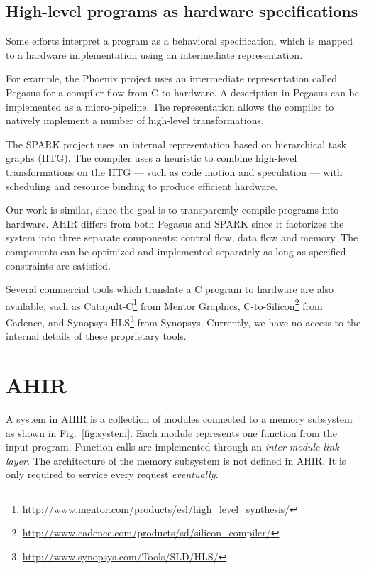 \documentclass[conference]{IEEEtran}
\begin{document}
\subsection{High-level programs as hardware specifications}

Some efforts interpret a program as a behavioral
specification, which is mapped to a hardware implementation using an
intermediate representation.

For example, the Phoenix project uses an intermediate representation
called Pegasus\cite{pegasus-ir} for a compiler flow from C to
hardware\cite{pegasus-cash}. A description in Pegasus can be
implemented as a micro-pipeline. The representation allows the compiler
to natively implement a number of high-level transformations.

The SPARK\cite{spark-vlsi-paper} project uses an internal
representation based on hierarchical task graphs (HTG). The compiler
uses a heuristic to combine high-level transformations on the HTG ---
such as code motion and speculation\cite{spark-code-motion} --- with
scheduling and resource binding to produce efficient hardware.

Our work is similar, since the goal is to transparently compile
programs into hardware. AHIR differs from both Pegasus and SPARK since
it factorizes the system into three separate components: control flow,
data flow and memory.  The components can be optimized and
implemented separately as long as specified constraints are satisfied.

Several commercial tools which translate a C program to hardware are
also available, such as 
Catapult-C\footnote{\url{http://www.mentor.com/products/esl/high_level_synthesis/}}
from Mentor Graphics,
C-to-Silicon\footnote{\url{http://www.cadence.com/products/sd/silicon_compiler/}}
from Cadence, and 
Synopsys HLS\footnote{\url{http://www.synopsys.com/Tools/SLD/HLS/}} from Synopsys. 
Currently, we have no access to the internal details of
these proprietary tools.


\section{AHIR}

A system in AHIR is a collection of modules connected to a memory
subsystem as shown in Fig.~\ref{fig:system}. Each module represents
one function from the input program. Function calls are implemented
through an \emph{inter-module link layer}. The architecture of the
memory subsystem is not defined in AHIR. It is only required to
service every request \emph{eventually}.
\end{document}
